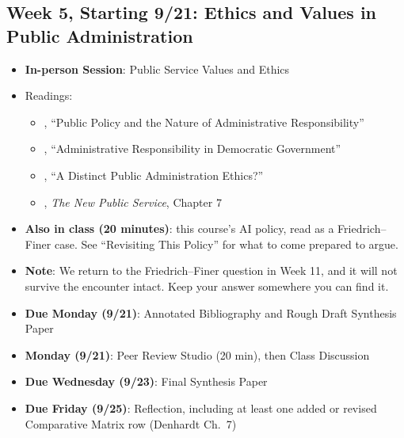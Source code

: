 \documentclass[11pt]{article}     %
\begin{document}
\subsection*{Week 5, Starting 9/21: Ethics and Values in Public Administration}
\begin{itemize}
    \item \textbf{In-person Session}: Public Service Values and Ethics
    \item Readings:
        \begin{itemize}
            \item \citet{friedrich1940}, ``Public Policy and the Nature of Administrative Responsibility''
            \item \citet{finer1941a}, ``Administrative Responsibility in Democratic Government''
            \item \citet{goss1996}, ``A Distinct Public Administration Ethics?''
            \item \citet{Denhardt2015}, \emph{The New Public Service}, Chapter 7
        \end{itemize}
    \item \textbf{Also in class (20 minutes)}: this course's AI policy, read as a Friedrich--Finer case. See ``Revisiting This Policy'' for what to come prepared to argue.
    \item \textbf{Note}: We return to the Friedrich--Finer question in Week 11, and it will not survive the encounter intact. Keep your answer somewhere you can find it.
    \item \textbf{Due Monday (9/21)}: Annotated Bibliography and Rough Draft Synthesis Paper
    \item \textbf{Monday (9/21)}: Peer Review Studio (20 min), then Class Discussion
    \item \textbf{Due Wednesday (9/23)}: Final Synthesis Paper
    \item \textbf{Due Friday (9/25)}: Reflection, including at least one added or revised Comparative Matrix row (Denhardt Ch.\ 7)
\end{itemize}
\end{document}
